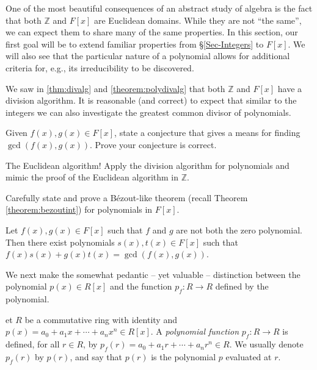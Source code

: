 \documentclass[english,course]{lecture}
\newenvironment{solution}[1][Solution]{\begin{trivlist}\pushQED{\qed}\item[\hskip \labelsep  \bfseries #1{}.\hspace{10pt}]}{\popQED\end{trivlist}}\renewcommand{\qedsymbol}{$\checkmark$}{\newenvironment{answer}{\renewcommand\qedsymbol{$\blacklozenge$}\begin{proof}[Answer]}{\end{proof}}}\newenvironment{answer}[1][Answer]{\begin{trivlist}\pushQED{\qed}\item[\hskip \labelsep  \bfseries #1{}.\hspace{10pt}]}{\popQED\end{trivlist}}\renewcommand{\qedsymbol}{$\lozenge$}
\theoremstyle{plain}
\newenvironment{definition}[1]
  {\renewcommand\theinnerdefinition{#1}\innerdefinition}
  {\endinnerdefinition}
\def\Z{{\mathbb Z}}
\def\Q{{\mathbb Q}}
\def\presnotes{}
\begin{document}



One of the most beautiful consequences of an abstract study of algebra is the fact that both $\Z$ and $F[x]$ are Euclidean domains.
While they are not ``the same'', we can expect them to share many of the same properties.
In this section, our first goal will be to extend familiar properties from \S \ref{Sec-Integers} to $F[x]$. 
We will also see that the particular nature of a polynomial allows for additional criteria for, e.g., its irreducibility to be discovered.


We saw in \ref{thm:divalg} and \ref{theorem:polydivalg} that both $\Z$ and $F[x]$ have a division algorithm. It is reasonable (and correct) to expect that similar to the integers we can also investigate the greatest common divisor of polynomials.


\begin{exer}
	Given $f(x),g(x)\in F[x]$, state a conjecture that gives a means for finding $\gcd(f(x),g(x))$.
	Prove your conjecture is correct.
\end{exer}

\begin{solution}
	The Euclidean algorithm! Apply the division algorithm for polynomials and mimic the proof of the Euclidean algorithm in $\Z$.
\end{solution}

\presnotes

\begin{exer}
	Carefully state and prove a B\'{e}zout-like theorem (recall Theorem \ref{theorem:bezoutint}) for polynomials in $F[x]$.
\end{exer}

\begin{solution}
	Let $f(x), g(x)\in F[x]$ such that $f$ and $g$ are not both the zero polynomial.
	Then there exist polynomials $s(x), t(x)\in F[x]$ such that $f(x) s(x) + g(x) t(x) = \gcd(f(x),g(x))$.
\end{solution}

\presnotes



We next make the somewhat pedantic -- yet valuable -- distinction between the polynomial $p(x)\in R[x]$ and the function $p_f : R\to R$ defined by the polynomial.



\begin{definition}
	Let $R$ be a commutative ring with identity and $p(x) = a_0 + a_1 x + \cdots + a_n x^n \in R[x]$.
	A \emph{polynomial function} $p_f : R \to R$ is defined, for all $r\in R$, by $p_f(r) = a_0 + a_1 r + \cdots + a_n r^n \in R$.
	We usually denote $p_f(r)$ by $p(r)$, and say that $p(r)$ is the polynomial $p$ evaluated at $r$.
\end{definition}
\end{document}
